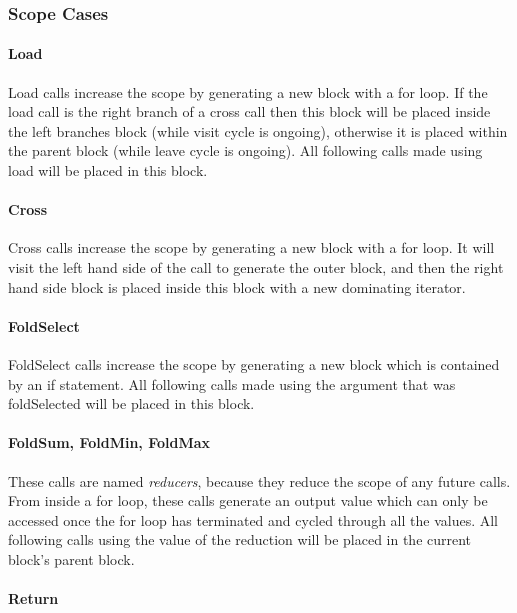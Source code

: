 \subsubsection{Scope Cases}

\paragraph{Load}

Load calls increase the scope by generating a new block with a for loop. If the load call is the right branch of a cross call then this block will be placed inside the left branches block (while visit cycle is ongoing), otherwise it is placed within the parent block (while leave cycle is ongoing). All following calls made using load will be placed in this block.

\paragraph{Cross}

Cross calls increase the scope by generating a new block with a for loop. It will visit the left hand side of the call to generate the outer block, and then the right hand side block is placed inside this block with a new dominating iterator.

\paragraph{FoldSelect}

FoldSelect calls increase the scope by generating a new block which is contained by an if statement. All following calls made using the argument that was foldSelected will be placed in this block.

\paragraph{FoldSum, FoldMin, FoldMax}

These calls are named \emph{reducers}, because they reduce the scope of any future calls. From inside a for loop, these calls generate an output value which can only be accessed once the for loop has terminated and cycled through all the values. All following calls using the value of the reduction will be placed in the current block's parent block.

\paragraph{Return}

